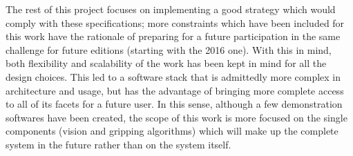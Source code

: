 The rest of this project focuses on implementing a good strategy which
would comply with these specifications; more constraints which have
been included for this work have the rationale of preparing for a
future participation in the same challenge for future editions
(starting with the 2016 one). With this in mind, both flexibility and
scalability of the work has been kept in mind for all the design
choices. This led to a software stack that is admittedly more
complex in architecture and usage, but has the advantage of bringing
more complete access to all of its facets for a future user. In this
sense, although a few demonstration softwares have been created, the
scope of this work is more focused on the single components (vision
and gripping algorithms) which will make up the complete system in the
future rather than on the system itself.
